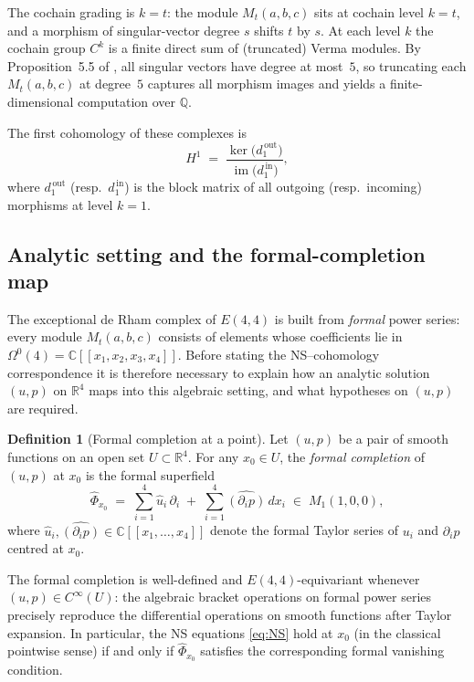 \documentclass[reqno,10pt]{amsart}
\theoremstyle{definition}
\newtheorem{defin}[subsubsection]{Definition}
\begin{document}
The cochain grading is $k = t$: the module $M_t(a,b,c)$ sits at cochain level $k=t$,
and a morphism of singular-vector degree $s$ shifts $t$ by $s$.  At each level
$k$ the cochain group $C^k$ is a finite direct sum of (truncated) Verma modules.
By Proposition~5.5 of \cite{CCK2026}, all singular vectors have degree at most~$5$,
so truncating each $M_t(a,b,c)$ at degree~$5$ captures all morphism images and
yields a finite-dimensional computation over $\mathbb{Q}$.

The first cohomology of these complexes is
\[
  H^1 \;=\; \frac{\ker\bigl(d^{\,\text{out}}_1\bigr)}{\operatorname{im}\bigl(d^{\,\text{in}}_1\bigr)},
\]
where $d^{\,\text{out}}_1$ (resp.\ $d^{\,\text{in}}_1$) is the block matrix of all outgoing
(resp.\ incoming) morphisms at level $k=1$.

\subsection{Analytic setting and the formal-completion map}
\label{subsec:analytic}

The exceptional de Rham complex of $E(4,4)$ is built from \emph{formal}
power series: every module $M_t(a,b,c)$ consists of elements whose
coefficients lie in $\Omega^0(4) = \mathbb{C}[[x_1,x_2,x_3,x_4]]$.
Before stating the NS--cohomology correspondence it is therefore necessary
to explain how an analytic solution $(u,p)$ on $\mathbb{R}^4$ maps into
this algebraic setting, and what hypotheses on $(u,p)$ are required.

\begin{defin}[Formal completion at a point]\label{def:formal-completion}
Let $(u,p)$ be a pair of smooth functions on an open set
$U\subset\mathbb{R}^4$.  For any $x_0\in U$, the \emph{formal completion}
of $(u,p)$ at $x_0$ is the formal superfield
\[
  \widehat{\Phi}_{x_0}
  \;=\;
  \sum_{i=1}^4 \hat{u}_i\,\partial_i
  \;+\;
  \sum_{i=1}^4 \widehat{(\partial_i p)}\,dx_i
  \;\in\; M_1(1,0,0),
\]
where $\hat{u}_i, \widehat{(\partial_i p)}\in\mathbb{C}[[x_1,\ldots,x_4]]$
denote the formal Taylor series of $u_i$ and $\partial_i p$ centred at $x_0$.
\end{defin}

The formal completion is well-defined and $E(4,4)$-equivariant whenever
$(u,p)\in C^\infty(U)$: the algebraic bracket operations on formal power
series precisely reproduce the differential operations on smooth functions
after Taylor expansion.  In particular, the NS equations
\eqref{eq:NS} hold at $x_0$ (in the classical pointwise sense) if and
only if $\widehat{\Phi}_{x_0}$ satisfies the corresponding formal
vanishing condition.
\end{document}
